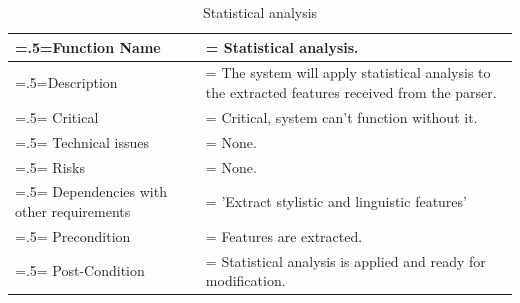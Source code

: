 \begin{center}
    \begin{table}[H]
        \caption{Statistical analysis}
        \begin{tabularx}{\textwidth} {
                | >{\raggedright\arraybackslash\hsize=.5\hsize\linewidth=\hsize}X
                | >{\raggedright\arraybackslash\hsize=1.5\hsize\linewidth=\hsize}X |}
            \hline
            Function Name                        & Statistical analysis.                                                                          \\ \hline
            Description                          & The system will apply statistical analysis to the extracted features received from the parser. \\ \hline
            Critical                             & Critical, system can't function without it.                                                    \\ \hline
            Technical issues                     & None.                                                                                          \\ \hline
            Risks                                & None.                                                                                          \\ \hline
            Dependencies with other requirements & 'Extract stylistic and linguistic features'                                                    \\ \hline
            Precondition                         & Features are extracted.                                                                        \\ \hline
            Post-Condition                       & Statistical analysis is applied and ready for modification.                                    \\ \hline
        \end{tabularx}
    \end{table}
\end{center}

